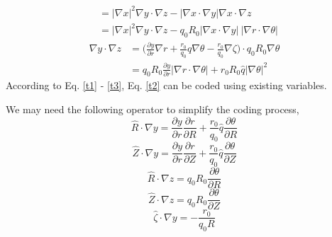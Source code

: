 \documentclass[12pt]{article}
\begin{document}
\begin{CJK*}{UTF8}{gbsn}
{\begin{equation}
\begin{split}
        &=|\nabla x|^2\nabla y\cdot\nabla z - |\nabla x\cdot\nabla y|\nabla x\cdot\nabla z\\
        &=|\nabla x|^2\nabla y\cdot\nabla z - q_0R_0|\nabla x\cdot\nabla y|\ |\nabla r\cdot\nabla\theta|
    \end{split}
\end{equation}
\begin{equation}
    \begin{split}
        \nabla y\cdot\nabla z &= \bigg(\frac{\partial y}{\partial r}\nabla r + \frac{r_0}{q_0}\hat{q}\nabla\theta 
        - \frac{r_0}{q_0}\nabla\zeta\bigg)\cdot q_0 R_0\nabla\theta\\
        &=q_0R_0\frac{\partial y}{\partial r}|\nabla r\cdot\nabla\theta| + r_0R_0\hat{q}|\nabla\theta|^2\label{t3}
    \end{split}
\end{equation}
}
According to Eq. \ref{t1} - \ref{t3}, Eq. \ref{t2} can be coded using existing variables.

We may need the following operator to simplify the coding process,
\begin{equation*}
    \hat{R}\cdot\nabla y = \frac{\partial y}{\partial r}\frac{\partial r}{\partial R} + \frac{r_0}{q_0}\hat{q}\frac{\partial \theta}{\partial R}
\end{equation*}
\begin{equation*}
    \hat{Z}\cdot\nabla y = \frac{\partial y}{\partial r}\frac{\partial r}{\partial Z} + \frac{r_0}{q_0}\hat{q}\frac{\partial \theta}{\partial Z}
\end{equation*}
\begin{equation*}
    \hat{R}\cdot\nabla z = q_0R_0\frac{\partial \theta}{\partial R}
\end{equation*}
\begin{equation*}
    \hat{Z}\cdot\nabla z = q_0R_0\frac{\partial \theta}{\partial Z}
\end{equation*}
\begin{equation*}
    \hat{\zeta}\cdot\nabla y = -\frac{r_0}{q_0R}
\end{equation*}
\newpage


\end{CJK*}
\end{document}
